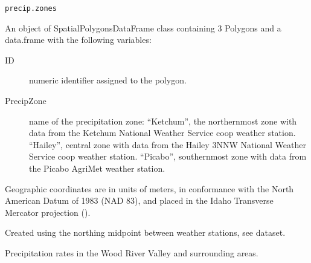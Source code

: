 \documentclass[a4paper]{book}
\begin{document}
%
\begin{Usage}
\begin{verbatim}
precip.zones
\end{verbatim}
\end{Usage}
%
\begin{Format}
An object of SpatialPolygonsDataFrame class containing 3 Polygons and a
data.frame with the following variables:
\begin{description}

\item[ID] numeric identifier assigned to the polygon.
\item[PrecipZone] name of the precipitation zone:
``Ketchum'', the northernmost zone with data from the
Ketchum National Weather Service coop weather station.
``Hailey'', central zone with data from the
Hailey 3NNW National Weather Service coop weather station.
``Picabo'', southernmost zone with data from the
Picabo AgriMet weather station.

\end{description}

Geographic coordinates are in units of meters, in conformance with the
North American Datum of 1983 (NAD 83), and placed in the
Idaho Transverse Mercator projection ().
\end{Format}
%
\begin{Source}\relax
Created using the northing midpoint between weather stations,
see  dataset.
\end{Source}
%
\begin{SeeAlso}\relax
{}
\end{SeeAlso}
%
\begin{Examples}
\end{Examples}
%
\begin{Description}\relax
Precipitation rates in the Wood River Valley and surrounding areas.
\end{Description}
\end{document}
